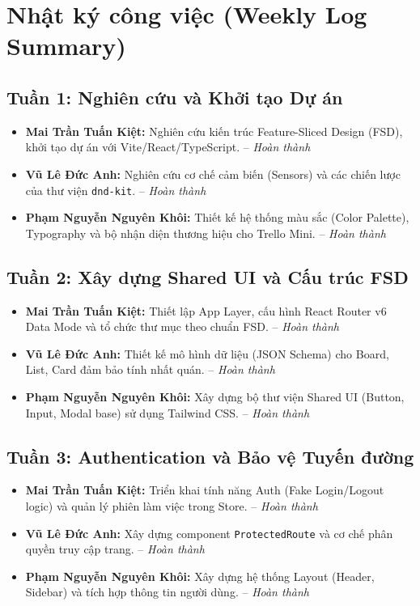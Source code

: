 \appendix

\chapter{Nhật ký công việc (Weekly Log Summary)}

\section*{Tuần 1: Nghiên cứu và Khởi tạo Dự án}
\begin{itemize}
    \item \textbf{Mai Trần Tuấn Kiệt:} Nghiên cứu kiến trúc Feature-Sliced Design (FSD), khởi tạo dự án với Vite/React/TypeScript. -- \textit{Hoàn thành}
    \item \textbf{Vũ Lê Đức Anh:} Nghiên cứu cơ chế cảm biến (Sensors) và các chiến lược của thư viện \texttt{dnd-kit}. -- \textit{Hoàn thành}
    \item \textbf{Phạm Nguyễn Nguyên Khôi:} Thiết kế hệ thống màu sắc (Color Palette), Typography và bộ nhận diện thương hiệu cho Trello Mini. -- \textit{Hoàn thành}
\end{itemize}

\section*{Tuần 2: Xây dựng Shared UI và Cấu trúc FSD}
\begin{itemize}
    \item \textbf{Mai Trần Tuấn Kiệt:} Thiết lập App Layer, cấu hình React Router v6 Data Mode và tổ chức thư mục theo chuẩn FSD. -- \textit{Hoàn thành}
    \item \textbf{Vũ Lê Đức Anh:} Thiết kế mô hình dữ liệu (JSON Schema) cho Board, List, Card đảm bảo tính nhất quán. -- \textit{Hoàn thành}
    \item \textbf{Phạm Nguyễn Nguyên Khôi:} Xây dựng bộ thư viện Shared UI (Button, Input, Modal base) sử dụng Tailwind CSS. -- \textit{Hoàn thành}
\end{itemize}

\section*{Tuần 3: Authentication và Bảo vệ Tuyến đường}
\begin{itemize}
    \item \textbf{Mai Trần Tuấn Kiệt:} Triển khai tính năng Auth (Fake Login/Logout logic) và quản lý phiên làm việc trong Store. -- \textit{Hoàn thành}
    \item \textbf{Vũ Lê Đức Anh:} Xây dựng component \texttt{ProtectedRoute} và cơ chế phân quyền truy cập trang. -- \textit{Hoàn thành}
    \item \textbf{Phạm Nguyễn Nguyên Khôi:} Xây dựng hệ thống Layout (Header, Sidebar) và tích hợp thông tin người dùng. -- \textit{Hoàn thành}
\end{itemize}

